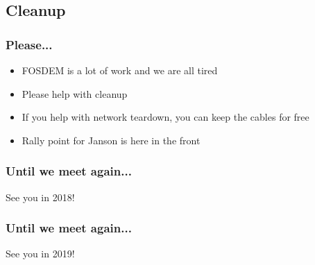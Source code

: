 \documentclass[t]{beamer}
\begin{document}
\subsection{Cleanup}

\begin{frame}
	\frametitle{Please...}
	\vfill
	\begin{itemize}
		\item FOSDEM is a lot of work and we are all tired
		\item Please help with cleanup
		\item If you help with network teardown, you can keep the cables for free
		\item Rally point for Janson is here in the front
	\end{itemize}
	\vfill
\end{frame}

\begin{frame}
	\frametitle{Until we meet again...}
	\vfill
	\begin{center}
		{\Huge See you in 2018!}
	\end{center}
	\vfill
\end{frame}

\begin{frame}
	\frametitle{Until we meet again...}
	\vfill
	\begin{center}
		{\Huge See you in 2019!}
	\end{center}
	\vfill
\end{frame}
\end{document}
